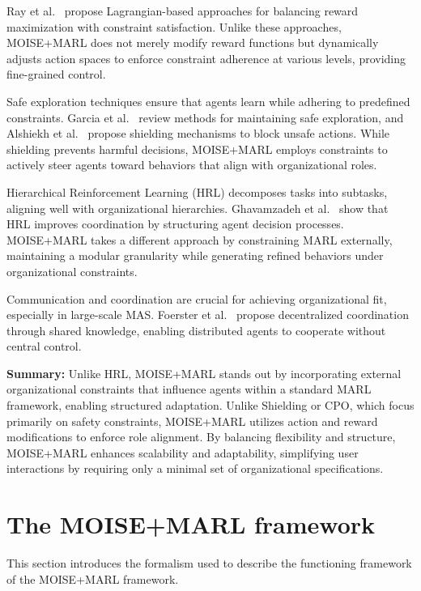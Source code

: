 \documentclass[pdflatex,sn-mathphys-num]{sn-jnl}%
\theoremstyle{thmstyleone}%
\theoremstyle{thmstyletwo}%
\theoremstyle{thmstylethree}%
\begin{document}
Ray et al.~\cite{ray2019benchmarking} propose Lagrangian-based approaches for balancing reward maximization with constraint satisfaction. Unlike these approaches, MOISE+MARL does not merely modify reward functions but dynamically adjusts action spaces to enforce constraint adherence at various levels, providing fine-grained control.

Safe exploration techniques ensure that agents learn while adhering to predefined constraints. Garcia et al.~\cite{garcia2015comprehensive} review methods for maintaining safe exploration, and Alshiekh et al.~\cite{alshiekh2018safe} propose shielding mechanisms to block unsafe actions. While shielding prevents harmful decisions, MOISE+MARL employs constraints to actively steer agents toward behaviors that align with organizational roles.

Hierarchical Reinforcement Learning (HRL) decomposes tasks into subtasks, aligning well with organizational hierarchies. Ghavamzadeh et al.~\cite{ghavamzadeh2006hrl} show that HRL improves coordination by structuring agent decision processes. MOISE+MARL takes a different approach by constraining MARL externally, maintaining a modular granularity while generating refined behaviors under organizational constraints.

Communication and coordination are crucial for achieving organizational fit, especially in large-scale MAS. Foerster et al.~\cite{foerster2018communication} propose decentralized coordination through shared knowledge, enabling distributed agents to cooperate without central control.

\medskip

\noindent \textbf{Summary:} Unlike HRL, MOISE+MARL stands out by incorporating external organizational constraints that influence agents within a standard MARL framework, enabling structured adaptation. Unlike Shielding or CPO, which focus primarily on safety constraints, MOISE+MARL utilizes action and reward modifications to enforce role alignment. By balancing flexibility and structure, MOISE+MARL enhances scalability and adaptability, simplifying user interactions by requiring only a minimal set of organizational specifications.



\section{The MOISE+MARL framework}\label{sec:moise_marl}

This section introduces the formalism used to describe the functioning framework of the MOISE+MARL framework.
\end{document}
